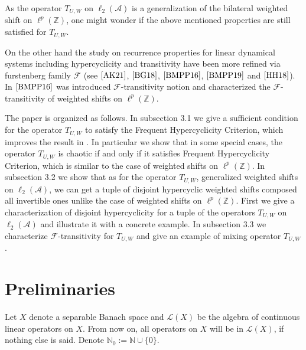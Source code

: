 \documentclass{article}
\begin{document}
As the operator $T_{U, W}$ on $\ell_{2}(\mathcal{A})$ is a generalization of the bilateral weighted shift on $\ell^{p}(\mathbb{Z})$, one might wonder if the above mentioned properties are still satisfied for $T_{U, W}$.

On the other hand the study on recurrence properties for linear dynamical systems including hypercyclicity and transitivity have been more refined via furstenberg family $\mathcal{F}$ (see $\cite{AK21}$, $\cite{BG18}$, $\cite{BMPP16}$, $\cite{BMPP19}$ and $\cite{HH18}$).
In $\cite{BMPP16}$ was introduced $\mathcal{F}$-transitivity notion and characterized the $\mathcal{F}$-transitivity of weighted shifts on $\ell^{p}(\mathbb{Z})$.




The paper is organized as follows. In subsection 3.1 we give a sufficient condition for the operator $T_{U, W}$ to satisfy the Frequent Hypercyclicity Criterion, which improves the result in \cite{I24}. In particular we show that in some special cases, the operator  $T_{U, W}$ is chaotic if and only if it satisfies Frequent Hypercyclicity Criterion, which is similar to the case of weighted shifts on $\ell^{p}(\mathbb{Z})$.
In subsection 3.2  we show that as for the operator $T_{U, W}$, generalized weighted shifts on $\ell_{2}(\mathcal{A})$, we can get a tuple of disjoint hypercyclic weighted shifts  composed all invertible ones unlike the case of  weighted shifts on $\ell^{p}(\mathbb{Z})$. First  we give a characterization of disjoint hypercyclicity for a tuple of  the operators $T_{U,W}$ on $\ell_{2}(\mathcal{A})$ 
 and  illustrate it with a concrete example.
In subsection 3.3 we characterize $\mathcal{F}$-transitivity for $T_{U, W}$ and give an example of mixing operator $T_{U, W}$.






\section{Preliminaries}
Let $X$ denote a separable Banach space and $\mathcal{L}(X)$ be the algebra of continuous linear operators on $X$. From
now on, all operators on  $X$  will be in $\mathcal{L}(X)$, if nothing else is said. Denote $\mathbb{N}_{0}:=\mathbb{N}\cup \{0\}$.
\end{document}
